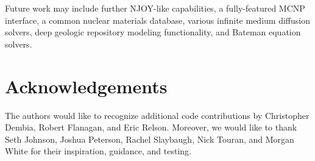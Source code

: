 \documentclass{anstrans}
\begin{document}
Future work may include further NJOY-like capabilities, a fully-featured 
MCNP interface, a common nuclear materials database, various infinite medium
diffusion solvers, deep geologic repository modeling functionality, and Bateman 
equation solvers.

\section*{Acknowledgements}
The authors would like to recognize additional code contributions by 
Christopher Dembia, Robert Flanagan, and Eric Relson.  Moreover, we 
would like to thank
Seth Johnson,
Joshua Peterson, 
Rachel Slaybaugh, 
Nick Touran,
and Morgan White
for their inspiration, guidance, and testing.


\nocite{*}


\end{document}
